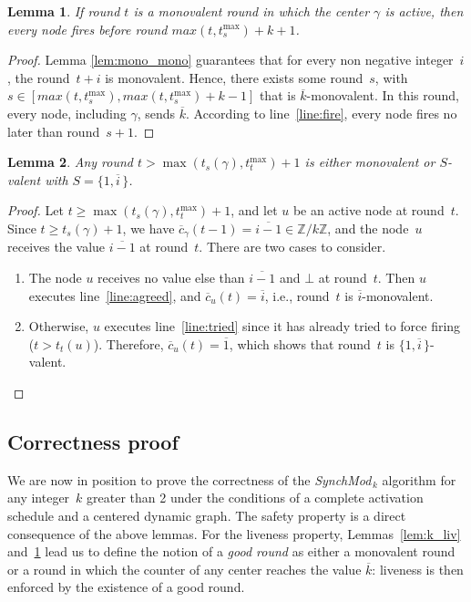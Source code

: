 \documentclass{article}
\newtheorem{lemma}{Lemma}[section]
\newcommand{\cent}{\gamma}
\newcommand{\try}{t_{t}}
\newcommand{\SM}{{\em SynchMod}$_{\,k}$ }
\begin{document}
\begin{lemma}\label{lem:mono_liv}
If  round $t$ is a monovalent round in which the center $\cent$ is active, then 
	every node fires before round $max( t, t_s^{\max} )+k + 1$.
\end{lemma}
\begin{proof}
Lemma \ref{lem:mono_mono} guarantees that for every non negative integer~$i$,
	the round~$t +i$ is monovalent.   
Hence, there exists some round~$s$, with $ s \in [ max( t, t_s^{\max} ) , max( t, t_s^{\max} )+ k - 1 ] $ 
	that is  $\overline{k}$-monovalent.
In this round, every node, including $\cent$, sends $\overline{k}$.
According to line~\ref{line:fire}, every node fires no later than round~$s+1$.
\end{proof}


\begin{lemma}\label{lem:mono_bi}
Any round $t > \max (t_s(\cent), \try^{\max}) + 1$  is either monovalent or 
	$S$-valent with  $S = \{1, \overline{i} \, \}$.
\end{lemma}
\begin{proof}
Let $t \geq \max (t_s(\cent), \try^{\max}) + 1$, and let $u$ be an active node at round~$t$.
Since $t \geq t_s(\cent) +1$, we have $ \overline{c}_\cent(t - 1) = \overline{i -1 } \in \mathds{Z}/k\mathds{Z} $,
	and the node~$u$ receives the value $ \overline{i - 1}$ at round~$t$.
There are two cases to consider.
\begin{enumerate}
\item The node $u$ receives no value else than $\overline{i -1}$ and $\bot$ at round~$t$.
 Then $u$ executes line~\ref{line:agreed}, and $\overline{c}_u(t) = \overline{ i }$, i.e.,
 	round~$t$ is $ \overline{ i }$-monovalent.
\item Otherwise, $u$ executes line~\ref{line:tried} since it has already tried to force firing ($t > \try(u)$).
Therefore, $\overline{c}_u(t) = \overline{1}$, which shows that round~$t$ is $\{1, \overline{ i } \, \}$-valent.
\end{enumerate}
\end{proof}

\subsection{Correctness proof}

We are now in position to prove the correctness of the \SM algorithm for any integer~$k$ greater than 2
	under the conditions of a complete activation schedule and a  centered dynamic graph.
The safety property is a direct consequence of the above lemmas.
For the liveness property, Lemmas~\ref{lem:k_liv} and~\ref{lem:mono_liv} lead us to define the notion 
	of a \emph{good round}  as either a monovalent round or a round in which  the  counter of any 
	center reaches  the value $\overline{k}$:
	liveness is then enforced by the existence of a good round.
\end{document}
